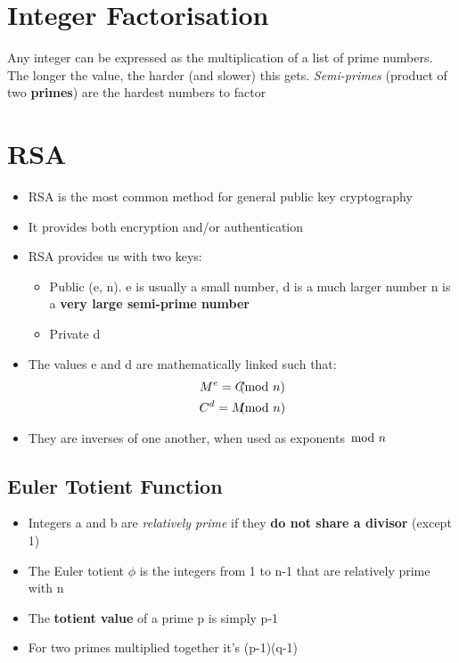 \documentclass{article}
\begin{document}
\tableofcontents

\newpage

\section{Integer Factorisation}
\begin{flushleft}
Any integer can be expressed as the multiplication of a list of prime numbers. The longer the value, the harder (and slower) this gets. \textit{Semi-primes} (product of two \textbf{primes}) are the hardest numbers to factor
\end{flushleft}

\section{RSA}
\begin{itemize}
  \item RSA is the most common method for general public key cryptography 
  \item It provides both encryption and/or authentication 
  \item RSA provides us with two keys:
  \begin{itemize}
    \item Public (e, n). e is usually a small number, d is a much larger number n is a \textbf{very large semi-prime number}
    \item Private d
  \end{itemize}
  \item The values e and d are mathematically linked such that:
  \begin{gather}
   M^e = C \kern-0.3cm \pmod{n} \\
   C^d = M \kern-0.3cm \pmod{n}
  \end{gather}
  \item They are inverses of one another, when used as exponents $ \kern-0.2cm \mod{n}$
\end{itemize}

\subsection{Euler Totient Function}
\begin{itemize}
  \item Integers a and b are \textit{relatively prime} if they \textbf{do not share a divisor} (except 1) 
  \item The Euler totient $\phi$ is the integers from 1 to n-1 that are relatively prime with n
  \item The \textbf{totient value} of a prime p is simply p-1 
  \item For two primes multiplied together it’s (p-1)(q-1)
\end{itemize}
\end{document}
